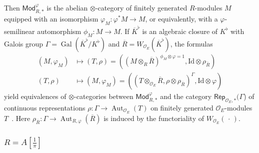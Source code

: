 \documentclass[11pt]{article}
\theoremstyle{definition}
\numberwithin{equation}{section}
\numberwithin{figure}{section}
\numberwithin{table}{section}
\newcommand{\Rep}{\mathsf{Rep}}
\newcommand{\Mod}{\mathsf{Mod}}
\DeclareMathOperator{\Gal}{Gal}
\DeclareMathOperator{\Aut}{Aut}
\begin{document}
Then $\Mod_{R,\ast}^{\varphi}$ is the abelian $\otimes$-category of finitely generated $R$-modules $M$ equipped with an isomorphism $\varphi_{M}:\varphi^{\ast}M\rightarrow M$, or equivalently, with a $\varphi$-semilinear automorphism $\phi_{M}:M\rightarrow M$. If $\overline{K}^{\flat}$ is an algebraic closure of $K^{\flat}$ with Galois group $\Gamma=\Gal(\overline{K}^{\flat}/K^{\flat})$ and $\overline{R}=W_{\mathcal{O}_{E}}(\overline{K}^{\flat})$, the formulas
\begin{align*}
(M,\varphi_{M}) & \mapsto (T,\rho)=\left(\left(M\otimes_{R}\overline{R}\right)^{\phi_{M}\otimes\varphi=1},\mathrm{Id}\otimes\rho_{\overline{R}}\right)\\
(T,\rho) & \mapsto (M,\varphi_{M})=\left(\left(T\otimes_{\mathcal{O}_{E}}\overline{R},\rho\otimes\rho_{\overline{R}}\right)^{\Gamma},\mathrm{Id}\otimes\varphi\right)
\end{align*}
yield equivalences of $\otimes$-categories between $\Mod_{R,\ast}^{\varphi}$ and the category $\Rep_{\mathcal{O}_{E},\ast}(\Gamma$) of continuous representations $\rho:\Gamma\rightarrow\Aut_{\mathcal{O}_{E}}(T)$ on finitely generated $\mathcal{O}_{E}$-modules $T$~\cite[1.2.6]{Fo90}. Here $\rho_{\overline{R}}:\Gamma\rightarrow\Aut_{R,\varphi}(\overline{R})$ is induced by the functoriality of $W_{\mathcal{O}_{E}}({\,\cdot\,})$.

\subsubsection{\texorpdfstring{${{R=A[\frac{1}{\pi}]}}$}{R=A[1/pi]}}\label{subsec:RisA=00005B1/pi=00005D}
\end{document}
